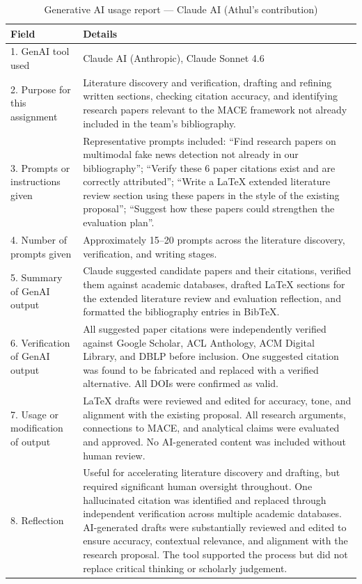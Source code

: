 \begin{table}[ht]
\centering
\caption{Generative AI usage report — Claude AI (Athul's contribution)}
\label{tab:athul_genai}
\renewcommand{\arraystretch}{1.3}
\begin{tabular}{|p{4.5cm}|p{8.5cm}|}
\hline
\textbf{Field} & \textbf{Details} \\
\hline
1. GenAI tool used & Claude AI (Anthropic), Claude Sonnet 4.6 \\
\hline
2. Purpose for this assignment & Literature discovery and verification, drafting and refining written sections, checking citation accuracy, and identifying research papers relevant to the MACE framework not already included in the team's bibliography. \\
\hline
3. Prompts or instructions given & Representative prompts included: ``Find research papers on multimodal fake news detection not already in our bibliography''; ``Verify these 6 paper citations exist and are correctly attributed''; ``Write a LaTeX extended literature review section using these papers in the style of the existing proposal''; ``Suggest how these papers could strengthen the evaluation plan''. \\
\hline
4. Number of prompts given & Approximately 15--20 prompts across the literature discovery, verification, and writing stages. \\
\hline
5. Summary of GenAI output & Claude suggested candidate papers and their citations, verified them against academic databases, drafted LaTeX sections for the extended literature review and evaluation reflection, and formatted the bibliography entries in BibTeX. \\
\hline
6. Verification of GenAI output & All suggested paper citations were independently verified against Google Scholar, ACL Anthology, ACM Digital Library, and DBLP before inclusion. One suggested citation was found to be fabricated and replaced with a verified alternative. All DOIs were confirmed as valid. \\
\hline
7. Usage or modification of output & LaTeX drafts were reviewed and edited for accuracy, tone, and alignment with the existing proposal. All research arguments, connections to MACE, and analytical claims were evaluated and approved. No AI-generated content was included without human review. \\
\hline
8. Reflection & Useful for accelerating literature discovery and drafting, but required significant human oversight throughout. One hallucinated citation was identified and replaced through independent verification across multiple academic databases. AI-generated drafts were substantially reviewed and edited to ensure accuracy, contextual relevance, and alignment with the research proposal. The tool supported the process but did not replace critical thinking or scholarly judgement. \\
\hline
\end{tabular}
\end{table}
